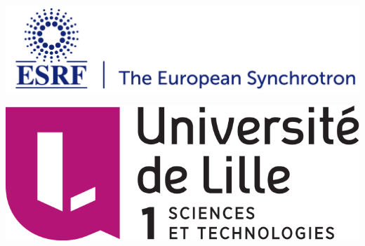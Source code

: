 \documentclass[11pt]{article}
\begin{document}
\parindent=0pt

\begin{minipage}{0.55\linewidth}
    \begin{flushleft}
    \includegraphics[scale=0.28]{ESRF_logo.png}
    \end{flushleft}
\end{minipage}
\hfill
\begin{minipage}{0.40\linewidth}
    \begin{center}
    \includegraphics[scale=0.28]{logo-lille1-2014.png}
    \end{center}
\end{minipage}

\vspace{0.2cm}
\hrulefill
\vspace{0.2cm}
\end{document}
